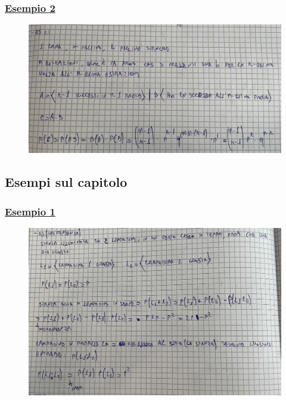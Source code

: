 \documentclass{article}
\begin{document}
\subsubsection{\underline{Esempio 2}} 
\begin{figure}[ht]
\centering
\includegraphics[scale=0.12]{ese/8.jpeg}
\end{figure}
\newpage
\subsection{Esempi sul capitolo}
\subsubsection{\underline{Esempio 1}}
\begin{figure}[ht]
\centering
\includegraphics[scale=0.12]{ese/9.jpeg}
\end{figure}
\end{document}
